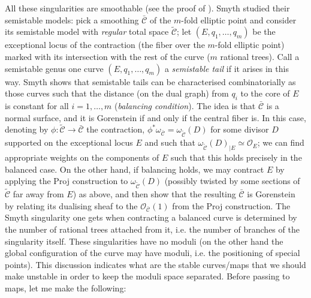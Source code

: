 \documentclass[11pt]{amsart}
\newcommand{\OO}{\mathcal{O}}
\renewcommand{\to}{\rightarrow}
\theoremstyle{definition}
\theoremstyle{definition}
\begin{document}
All these singularities are smoothable (see the proof of \cite[Theorem 3.8]{SMY1}). Smyth studied their semistable models: pick a smoothing $\bar{\mathcal C}$ of the $m$-fold elliptic point and consider its semistable model with \emph{regular} total space $\tilde{\mathcal C}$; let $(E,q_1,\ldots,q_m)$ be the exceptional locus of the contraction (the fiber over the $m$-fold elliptic point) marked with its intersection with the rest of the curve ($m$ rational trees). Call a semistable genus one curve $(E,q_1,\ldots,q_m)$ a \emph{semistable tail} if it arises in this way. Smyth shows \cite[Proposition 2.12]{SMY1} that semistable tails can be characterised combinatorially as those curves such that the distance (on the dual graph) from $q_i$ to the core of $E$ is constant for all $i=1,\ldots,m$ (\emph{balancing condition}). The idea is that $\bar{\mathcal C}$ is a normal surface, and it is Gorenstein if and only if the central fiber is. In this case, denoting by $\phi\colon \tilde{\mathcal C}\to\bar{\mathcal C}$ the contraction, $\phi^*\omega_{\bar{\mathcal C}}=\omega_{\tilde{\mathcal C}}(D)$ for some divisor $D$ supported on the exceptional locus $E$ and such that $\omega_{\tilde{\mathcal C}}(D)_{|E}\simeq\OO_E$; we can find appropriate weights on the components of $E$ such that this holds precisely in the balanced case. On the other hand, if balancing holds, we may contract $E$ by applying the Proj construction to $\omega_{\tilde{\mathcal C}}(D)$ (possibly twisted by some sections of $\tilde{\mathcal C}$ far away from $E$) as above, and then show that the resulting $\bar{\mathcal C}$ is Gorenstein by relating its dualising sheaf to the $\OO_{\bar{\mathcal C}}(1)$ from the Proj construction. The Smyth singularity one gets when contracting a balanced curve is determined by the number of rational trees attached from it, i.e. the number of branches of the singularity itself. These singularities have no moduli (on the other hand the global configuration of the curve may have moduli, i.e. the positioning of special points). This discussion indicates what are the stable curves/maps that we should make unstable in order to keep the moduli space separated. Before passing to maps, let me make the following:
\end{document}

